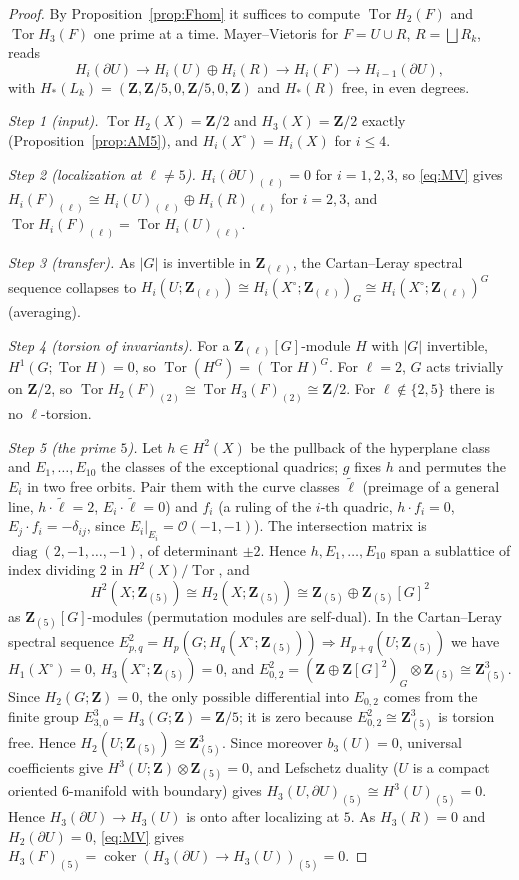 \documentclass[11pt]{amsart}
\numberwithin{equation}{section}
\theoremstyle{definition}
\theoremstyle{remark}
\newcommand{\Z}{\mathbf Z}
\DeclareMathOperator{\Tor}{Tor}
\begin{document}
\begin{proof}
By Proposition~\ref{prop:Fhom} it suffices to compute $\Tor H_2(F)$ and
$\Tor H_3(F)$ one prime at a time. Mayer--Vietoris for $F=U\cup R$,
$R=\bigsqcup R_k$, reads
\begin{equation}\label{eq:MV}
  H_i(\partial U)\to H_i(U)\oplus H_i(R)\to H_i(F)\to H_{i-1}(\partial U),
\end{equation}
with $H_*(L_k)=(\Z,\Z/5,0,\Z/5,0,\Z)$ and $H_*(R)$ free, in even degrees.

\emph{Step 1 (input).} $\Tor H_2(X)=\Z/2$ and $H_3(X)=\Z/2$ exactly
(Proposition~\ref{prop:AM5}), and $H_i(X^\circ)=H_i(X)$ for $i\le4$.

\emph{Step 2 (localization at $\ell\ne5$).} $H_i(\partial U)_{(\ell)}=0$
for $i=1,2,3$, so \eqref{eq:MV} gives
$H_i(F)_{(\ell)}\cong H_i(U)_{(\ell)}\oplus H_i(R)_{(\ell)}$ for $i=2,3$,
and $\Tor H_i(F)_{(\ell)}=\Tor H_i(U)_{(\ell)}$.

\emph{Step 3 (transfer).} As $|G|$ is invertible in $\Z_{(\ell)}$, the
Cartan--Leray spectral sequence collapses to
$H_i(U;\Z_{(\ell)})\cong H_i(X^\circ;\Z_{(\ell)})_G\cong
H_i(X^\circ;\Z_{(\ell)})^G$ (averaging).

\emph{Step 4 (torsion of invariants).} For a $\Z_{(\ell)}[G]$-module $H$
with $|G|$ invertible, $H^1(G;\Tor H)=0$, so $\Tor(H^G)=(\Tor H)^G$. For
$\ell=2$, $G$ acts trivially on $\Z/2$, so $\Tor H_2(F)_{(2)}\cong
\Tor H_3(F)_{(2)}\cong\Z/2$. For $\ell\notin\{2,5\}$ there is no
$\ell$-torsion.

\emph{Step 5 (the prime $5$).} Let $h\in H^2(X)$ be the pullback of the
hyperplane class and $E_1,\dots,E_{10}$ the classes of the exceptional
quadrics; $g$ fixes $h$ and permutes the $E_i$ in two free orbits. Pair
them with the curve classes $\tilde\ell$ (preimage of a general line,
$h\cdot\tilde\ell=2$, $E_i\cdot\tilde\ell=0$) and $f_i$ (a ruling of the
$i$-th quadric, $h\cdot f_i=0$, $E_j\cdot f_i=-\delta_{ij}$, since
$E_i|_{E_i}=\mathcal O(-1,-1)$). The intersection matrix is
$\operatorname{diag}(2,-1,\dots,-1)$, of determinant $\pm2$. Hence
$h,E_1,\dots,E_{10}$ span a sublattice of index dividing $2$ in
$H^2(X)/\Tor$, and
\[
  H^2(X;\Z_{(5)})\cong H_2(X;\Z_{(5)})\cong\Z_{(5)}\oplus\Z_{(5)}[G]^2
\]
as $\Z_{(5)}[G]$-modules (permutation modules are self-dual). In the
Cartan--Leray spectral sequence $E^2_{p,q}=H_p(G;H_q(X^\circ;\Z_{(5)}))
\Rightarrow H_{p+q}(U;\Z_{(5)})$ \cite[VII.7]{Brown1982} we have
$H_1(X^\circ)=0$, $H_3(X^\circ;\Z_{(5)})=0$, and
$E^2_{0,2}=(\Z\oplus\Z[G]^2)_G\otimes\Z_{(5)}\cong\Z_{(5)}^3$. Since
$H_2(G;\Z)=0$, the only possible differential into $E_{0,2}$ comes from
the finite group $E^3_{3,0}=H_3(G;\Z)=\Z/5$; it is zero because
$E^2_{0,2}\cong\Z_{(5)}^3$ is torsion free. Hence
$H_2(U;\Z_{(5)})\cong\Z_{(5)}^3$. Since moreover $b_3(U)=0$, universal
coefficients give $H^3(U;\Z)\otimes\Z_{(5)}=0$, and Lefschetz duality
($U$ is a compact oriented $6$-manifold with boundary) gives
$H_3(U,\partial U)_{(5)}\cong H^3(U)_{(5)}=0$. Hence
$H_3(\partial U)\to H_3(U)$ is onto after localizing at $5$. As
$H_3(R)=0$ and $H_2(\partial U)=0$, \eqref{eq:MV} gives
$H_3(F)_{(5)}=\operatorname{coker}(H_3(\partial U)\to H_3(U))_{(5)}=0$.


\end{proof}
\end{document}
